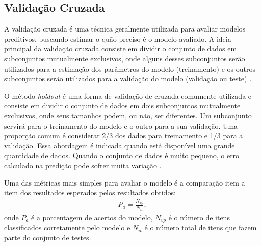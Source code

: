 \subsection{Validação Cruzada}

A validação cruzada é uma técnica geralmente utilizada para avaliar modelos preditivos, buscando estimar o quão preciso é o modelo avaliado. A ideia principal da validação cruzada consiste em dividir o conjunto de dados em subconjuntos mutualmente exclusivos, onde alguns desses subconjuntos serão utilizados para a estimação dos parâmetros do modelo (treinamento) e os outros subconjuntos serão utilizados para a validação do modelo (validação ou teste) \cite{kohavi1995}.

O método \textit{holdout} é uma forma de validação de cruzada comumente utilizada e consiste em dividir o conjunto de dados em dois subconjuntos mutualmente exclusivos, onde seus tamanhos podem, ou não, ser diferentes. Um subconjunto servirá para o treinamento do modelo e o outro para a sua validação. Uma proporção comum é considerar 2/3 dos dados para treinamento e 1/3 para a validação. Essa abordagem é indicada quando está disponível uma grande quantidade de dados. Quando o conjunto de dados é muito pequeno, o erro calculado na predição pode sofrer muita variação \cite{kohavi1995}.

Uma das métricas mais simples para avaliar o modelo é a comparação item a item dos resultados esperados pelos resultados obtidos:
%
\begin{align}
P_{a}=\frac{N_{vp}}{N_{it}},
\end{align}
%
onde \(P_{a}\) é a porcentagem de acertos do modelo, \(N_{vp}\) é o número de itens classificados corretamente pelo modelo e \(N_{it}\) é o número total de itens que fazem parte do conjunto de testes.

